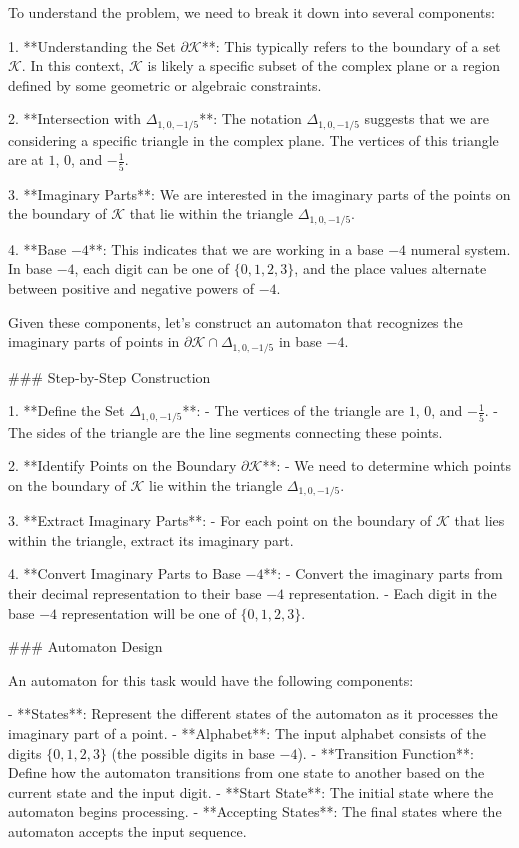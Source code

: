 To understand the problem, we need to break it down into several components:

1. **Understanding the Set \(\partial \mathcal{K}\)**: This typically refers to the boundary of a set \(\mathcal{K}\). In this context, \(\mathcal{K}\) is likely a specific subset of the complex plane or a region defined by some geometric or algebraic constraints.

2. **Intersection with \(\Delta_{1,0,-1/5}\)**: The notation \(\Delta_{1,0,-1/5}\) suggests that we are considering a specific triangle in the complex plane. The vertices of this triangle are at \(1\), \(0\), and \(-\frac{1}{5}\).

3. **Imaginary Parts**: We are interested in the imaginary parts of the points on the boundary of \(\mathcal{K}\) that lie within the triangle \(\Delta_{1,0,-1/5}\).

4. **Base \(-4\)**: This indicates that we are working in a base \(-4\) numeral system. In base \(-4\), each digit can be one of \(\{0, 1, 2, 3\}\), and the place values alternate between positive and negative powers of \(-4\).

Given these components, let's construct an automaton that recognizes the imaginary parts of points in \(\partial \mathcal{K} \cap \Delta_{1,0,-1/5}\) in base \(-4\).

### Step-by-Step Construction

1. **Define the Set \(\Delta_{1,0,-1/5}\)**:
   - The vertices of the triangle are \(1\), \(0\), and \(-\frac{1}{5}\).
   - The sides of the triangle are the line segments connecting these points.

2. **Identify Points on the Boundary \(\partial \mathcal{K}\)**:
   - We need to determine which points on the boundary of \(\mathcal{K}\) lie within the triangle \(\Delta_{1,0,-1/5}\).

3. **Extract Imaginary Parts**:
   - For each point on the boundary of \(\mathcal{K}\) that lies within the triangle, extract its imaginary part.

4. **Convert Imaginary Parts to Base \(-4\)**:
   - Convert the imaginary parts from their decimal representation to their base \(-4\) representation.
   - Each digit in the base \(-4\) representation will be one of \(\{0, 1, 2, 3\}\).

### Automaton Design

An automaton for this task would have the following components:

- **States**: Represent the different states of the automaton as it processes the imaginary part of a point.
- **Alphabet**: The input alphabet consists of the digits \(\{0, 1, 2, 3\}\) (the possible digits in base \(-4\)).
- **Transition Function**: Define how the automaton transitions from one state to another based on the current state and the input digit.
- **Start State**: The initial state where the automaton begins processing.
- **Accepting States**: The final states where the automaton accepts the input sequence.

